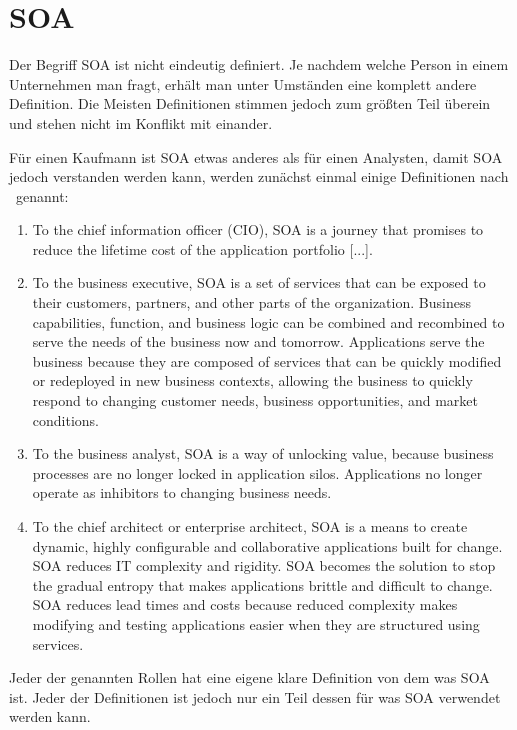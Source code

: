 \chapter{SOA}
\label{chap:soa}
Der Begriff SOA ist nicht eindeutig definiert. Je nachdem welche Person in einem Unternehmen man fragt, erhält man unter Umständen eine komplett andere Definition. \frqq Die Meisten Definitionen stimmen jedoch zum größten Teil überein und stehen nicht im Konflikt mit einander.\flqq\cite[vgl. Seite 6]{100QA}

Für einen Kaufmann ist SOA etwas anderes als für einen Analysten, damit SOA jedoch verstanden werden kann, werden zunächst einmal einige Definitionen nach \cite{100QA}\ genannt:
\begin{enumerate}
       \item \frqq To the chief information officer (CIO), SOA is a journey that
       promises to reduce the lifetime cost of the application portfolio [...].\flqq \cite[vgl. Seite 6]{100QA}
    
       \item \frqq To the business executive, SOA is a set of services that can be exposed to their customers, partners, and other parts of the organization. Business capabilities, function, and business logic can be combined and recombined to serve the needs of the business now and tomorrow. Applications serve the business because they are composed
       of services that can be quickly modified or redeployed in new
       business contexts, allowing the business to quickly respond to changing
       customer needs, business opportunities, and market conditions.\flqq \cite[vgl. Seite 6]{100QA}
       
       \item \frqq To the business analyst, SOA is a way of unlocking value, because business processes are no longer locked in application silos. Applications no longer operate as inhibitors to changing business needs.\flqq \cite[vgl. Seite 6]{100QA}
       
       \item \frqq To the chief architect or enterprise architect, SOA is a means to
       create dynamic, highly configurable and collaborative applications
       built for change. SOA reduces IT complexity and rigidity. SOA becomes the solution to stop the gradual entropy that makes applications
       brittle and difficult to change. SOA reduces lead times and costs
       because reduced complexity makes modifying and testing applications
       easier when they are structured using services.\flqq \cite[vgl. Seite ]{100QA}
\end{enumerate}
Jeder der genannten Rollen hat eine eigene klare Definition von dem was SOA ist. Jeder der Definitionen ist jedoch nur ein Teil dessen für was SOA verwendet werden kann.

